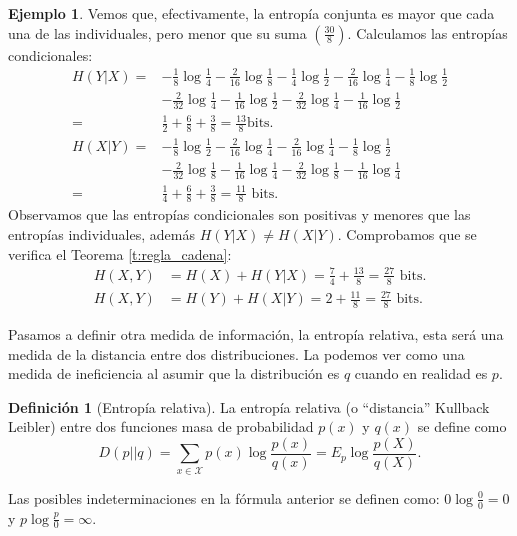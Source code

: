 \documentclass[10pt,a4paper]{article} %
\theoremstyle{definition}
\newtheorem{definition}{Definición}[section]
\newtheorem{example}[theorem]{Ejemplo}
\begin{document}
\begin{example}
  Vemos que, efectivamente, la entropía conjunta es mayor que cada una de las individuales, pero menor que su suma $\left( \frac{30}{8} \right )$. Calculamos las entropías condicionales:
  \begin{align*}
    H(Y|X) = &- \frac{1}{8} \log \frac{1}{4} - \frac{2}{16} \log\frac{1}{8} - \frac{1}{4} \log \frac{1}{2} - \frac{2}{16} \log \frac{1}{4} - \frac{1}{8} \log \frac{1}{2}\\
    &- \frac{2}{32} \log \frac{1}{4} - \frac{1}{16} \log \frac{1}{2} - \frac{2}{32} \log \frac{1}{4} - \frac{1}{16} \log \frac{1}{2}\\
    =& \frac{1}{2} + \frac{6}{8} + \frac{3}{8} = \frac{13}{8} \text {bits}.\\
    H(X|Y) = & - \frac{1}{8} \log \frac{1}{2} - \frac{2}{16} \log \frac{1}{4}- \frac{2}{16} \log \frac{1}{4} - \frac{1}{8} \log \frac{1}{2}\\
    &- \frac{2}{32} \log \frac{1}{8} - \frac{1}{16} \log \frac{1}{4} - \frac{2}{32} \log \frac{1}{8} - \frac{1}{16} \log \frac{1}{4}\\
    =& \frac{1}{4} + \frac{6}{8} + \frac{3}{8} = \frac{11}{8} \text{ bits}.
  \end{align*}
  Observamos que las entropías condicionales son positivas y menores que las entropías individuales, además $H(Y|X) \neq H(X|Y)$. Comprobamos que se verifica el Teorema \ref{t:regla_cadena}:
  \begin{align*}
    H(X,Y) &= H(X) + H(Y|X) = \frac{7}{4} + \frac{13}{8} = \frac{27}{8} \text{ bits}.\\
    H(X,Y) &= H(Y) + H(X|Y) = 2 + \frac{11}{8} = \frac{27}{8} \text{ bits}.
  \end{align*}
\end{example}

Pasamos a definir otra medida de información, la entropía relativa, esta será una medida de la distancia entre dos distribuciones. La podemos ver como una medida de ineficiencia al asumir que la distribución es $q$ cuando en realidad es $p$.

\begin{definition}[Entropía relativa]
  La entropía relativa (o ``distancia'' Kullback Leibler) entre dos funciones masa de probabilidad $p(x)$ y $q(x)$ se define como\[
D(p||q) = \sum_{x \in \mathcal{X}}p(x) \log \frac{p(x)}{q(x)} = E_p \log \frac{p(X)}{q(X)}.
  \]
\end{definition}
Las posibles indeterminaciones en la fórmula anterior se definen como: $0 \log \frac{0}{0} = 0$ y $p \log \frac{p}{0} = \infty$.
\end{document}
